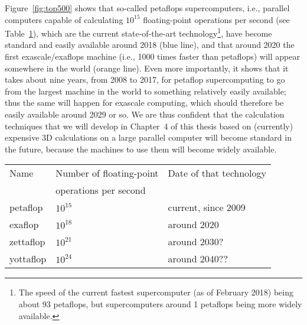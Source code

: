 Figure~\ref{fig:top500} shows that so-called petaflops supercomputers, i.e., parallel computers capable of calculating $10^{15}$ floating-point operations per second (see Table~\ref{table:petaflop_exaflop}), which are the current state-of-the-art technology\footnote{The speed of the current fastest supercomputer (as of February 2018) being about 93 petaflops, but supercomputers around 1 petaflops being more widely available.}, have become standard and easily available around 2018 (blue line), and that around 2020 the first exascale/exaflops machine (i.e., 1000 times faster than petaflops) will appear somewhere in the world (orange line). Even more importantly, it shows that it takes about nine years, from 2008 to 2017, for petaflop supercomputing to go from the largest machine in the world to something relatively easily available; thus the same will happen for exascale computing, which should therefore be easily available around 2029 or so. We are thus confident that the calculation techniques that we will develop in Chapter~4 of this thesis based on (currently) expensive 3D calculations on a large parallel computer will become standard in the future, because the machines to use them will become widely available.

    \begin{table}
        \centering
\vspace{5truemm}
        \begin{tabular}{lll}
        Name & Number of floating-point & Date of that technology \\
             & operations per second    &  \\ \hline
petaflop  & $10^{15}$ & current, since 2009 \\
exaflop   & $10^{18}$ & around 2020 \\
zettaflop & $10^{21}$ & around 2030? \\
yottaflop & $10^{24}$ & around 2040??
        \end{tabular}
        \label{table:petaflop_exaflop}
    \end{table}

